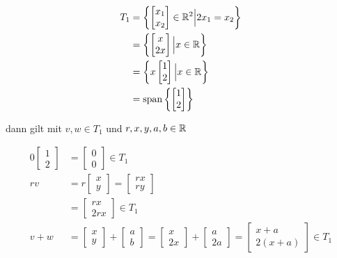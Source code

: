 \documentclass[a4paper, 11pt]{article}
\begin{document}
\begin{align*}
    T_1 &= \left\{ \begin{bmatrix} x_1 \\ x_2 \end{bmatrix} \in \mathbb{R}^2 \Big| 2 x_1 = x_2 \right\} \\
    &= \left\{ \begin{bmatrix} x \\ 2x \end{bmatrix} \Big| x \in \mathbb{R} \right\} \\
    &= \left\{ x \begin{bmatrix} 1 \\ 2 \end{bmatrix} \Big| x \in \mathbb{R} \right\} \\
    &= \text{span} \left\{ \begin{bmatrix} 1 \\ 2 \end{bmatrix} \right\} \\
\end{align*}

dann gilt mit \(v, w \in T_1\) und \(r, x, y, a, b \in \mathbb{R}\)

\begin{align*}
    0 \begin{bmatrix} 1 \\ 2 \end{bmatrix} &= \begin{bmatrix} 0 \\ 0 \end{bmatrix} \in T_1 \\
    r v &= r \begin{bmatrix} x \\ y \end{bmatrix} = \begin{bmatrix} rx \\ ry \end{bmatrix} \\
    &= \begin{bmatrix} rx \\ 2rx \end{bmatrix} \in T_1 \\
    v + w &= \begin{bmatrix} x \\ y \end{bmatrix} + \begin{bmatrix} a \\ b \end{bmatrix}
    = \begin{bmatrix} x \\ 2x \end{bmatrix} + \begin{bmatrix} a \\ 2a \end{bmatrix}
    = \begin{bmatrix} x + a \\ 2(x + a) \end{bmatrix} \in T_1
\end{align*}
\end{document}
